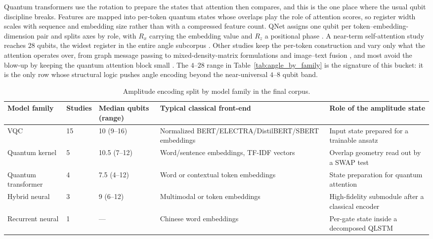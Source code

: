 \documentclass{ieeeaccess}
\begin{document}
Quantum transformers use the rotation to prepare the states that attention then compares, and this is the one place where the usual qubit discipline breaks. Features are mapped into per-token quantum states whose overlaps play the role of attention scores, so register width scales with sequence and embedding size rather than with a compressed feature count. QNet assigns one qubit per token--embedding-dimension pair and splits axes by role, with $R_x$ carrying the embedding value and $R_z$ a positional phase \cite{day_qnet_2023}. A near-term self-attention study reaches 28 qubits, the widest register in the entire angle subcorpus \cite{he_training_2024}. Other studies keep the per-token construction and vary only what the attention operates over, from graph message passing to mixed-density-matrix formulations and image--text fusion \cite{li_quantum_2024,aktar_quantum_2025,chen_quantum_2025,wu_multimodal_2025}, and most avoid the blow-up by keeping the quantum attention block small \cite{di_sipio_dawn_2022,pham_fitqt_2026}. The $4$--$28$ range in Table~\ref{tab:angle_by_family} is the signature of this bucket: it is the only row whose structural logic pushes angle encoding beyond the near-universal $4$--$8$ qubit band.

\begin{table}[t!]
\caption{Amplitude encoding split by model family in the final corpus.}
\label{tab:amplitude_by_family}
\centering
\scriptsize
\begin{tabular}{@{}p{} p{} p{} p{} p{}@{}}
\hline
\textbf{Model family} & \textbf{Studies} & \textbf{Median qubits (range)} & \textbf{Typical classical front-end} & \textbf{Role of the amplitude state} \\
\hline
VQC & 15 & 10 (9--16) & Normalized BERT/ELECTRA/DistilBERT/SBERT embeddings & Input state prepared for a trainable ansatz \\
Quantum kernel & 5 & 10.5 (7--12) & Word/sentence embeddings, TF-IDF vectors & Overlap geometry read out by a SWAP test \\
Quantum transformer & 4 & 7.5 (4--12) & Word or contextual token embeddings & State preparation for quantum attention \\
Hybrid neural & 3 & 9 (6--12) & Multimodal or token embeddings & High-fidelity submodule after a classical encoder \\
Recurrent neural & 1 & --- & Chinese word embeddings & Per-gate state inside a decomposed QLSTM \\
\hline
\end{tabular}
\end{table}
\end{document}
